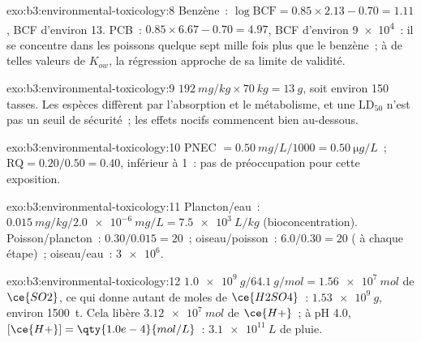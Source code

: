 \begin{solution}{exo:b3:environmental-toxicology:8}
Benzène~: $\log\mathrm{BCF} = 0.85 \times 2.13 - 0.70 = 1.11$, BCF d'environ 13. PCB~: $0.85 \times 6.67 - 0.70 = 4.97$, BCF d'environ
\num{9e4}~: il se concentre dans les poissons quelque sept mille fois plus que le benzène~; à de telles valeurs de
$K_{ow}$, la régression approche de sa limite de validité.
\end{solution}

\begin{solution}{exo:b3:environmental-toxicology:9}
$\qty{192}{mg/kg} \times \qty{70}{kg} = \qty{13}{g}$, soit environ 150 tasses. Les espèces diffèrent par l'absorption et le métabolisme,
et une $\mathrm{LD_{50}}$ n'est pas un seuil de sécurité~; les effets nocifs commencent bien au-dessous.
\end{solution}

\begin{solution}{exo:b3:environmental-toxicology:10}
PNEC $= \qty{0.50}{mg/L}/1000 = \qty{0.50}{\micro g/L}$~; $\mathrm{RQ} = 0.20/0.50 = 0.40$, inférieur à 1~: pas de préoccupation pour cette exposition.
\end{solution}

\begin{solution}{exo:b3:environmental-toxicology:11}
Plancton/eau~: $\qty{0.015}{mg/kg}/\qty{2.0e-6}{mg/L} = \qty{7.5e3}{L/kg}$ (bioconcentration). Poisson/plancton~: $0.30/0.015 = 20$~;
oiseau/poisson~: $6.0/0.30 = 20$ ( à chaque étape)~; oiseau/eau~: $\num{3e6}$.
\end{solution}

\begin{solution}{exo:b3:environmental-toxicology:12}
$\qty{1.0e9}{g}/\qty{64.1}{g/mol} = \qty{1.56e7}{mol}$ de $\ce{SO2}$, ce qui donne autant de moles de $\ce{H2SO4}$~: $\qty{1.53e9}{g}$, environ \qty{1500}{t}. Cela
libère $\qty{3.12e7}{mol}$ de $\ce{H+}$~; à pH 4.0, $[\ce{H+}] = \qty{1.0e-4}{mol/L}$~: $\qty{3.1e11}{L}$ de pluie.
\end{solution}

